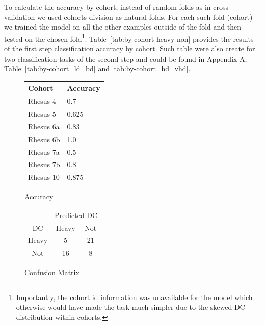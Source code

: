 	To calculate the accuracy by cohort, instead of random folds as in cross-validation we used cohorts division as natural folds. For each such fold (cohort) we trained the model on all the other examples outside of the fold and then tested on the chosen fold\footnote{Importantly, the cohort id information was unavailable for the model which otherwise would have made the task much simpler due to the skewed DC distribution within cohorts.}. Table~\ref{tab:by-cohort-heavy-non} provides the results of the first step classification accuracy by cohort. Such table were also create for two classification tasks of the second step and could be found in Appendix A, Table~\ref{tab:by-cohort_ld_bd} and \ref{tab:by-cohort_hd_vhd}.
	
	\begin{table}[h]
	\centering
	\caption{First step (heavy vs non-heavy) classification accuracy using cross-validation with the cohorts as natural folds.}
	\label{tab:by-cohort-heavy-non}
	\begin{subfigure}{0.3\linewidth}  \centering	
	\begin{tabular}{ll}	
		\hline
		\abovespace\belowspace
		\toprule Cohort & Accuracy\\ \midrule
		Rhesus 4 &  0.7\\
		Rhesus 5 & 0.625\\
		Rhesus 6a &  0.83\\
		Rhesus 6b & 1.0\\
		Rhesus 7a & 0.5\\
		Rhesus 7b &  0.8\\
		Rhesus 10 & 0.875\\ \bottomrule
	\end{tabular}
	\caption{Accuracy \label{table:by-cohort-accuracy-twocases}}		
	\end{subfigure}
	\begin{subfigure}{0.3\linewidth}\centering
	\begin{tabular}{ccc}
		\toprule  & \multicolumn{2}{c}{Predicted DC}\\ 
		\cmidrule(r){2-3}
		DC & Heavy & Not \\ \midrule
		Heavy & 5 & 21 \\
		Not & 16 & 8\\ \bottomrule
	\end{tabular}
	\caption{Confusion Matrix \label{table:by-cohort-cm-twocases}}		
	\end{subfigure}	
	\begin{subfigure}{\linewidth}\centering

\end{subfigure}
\end{table}
